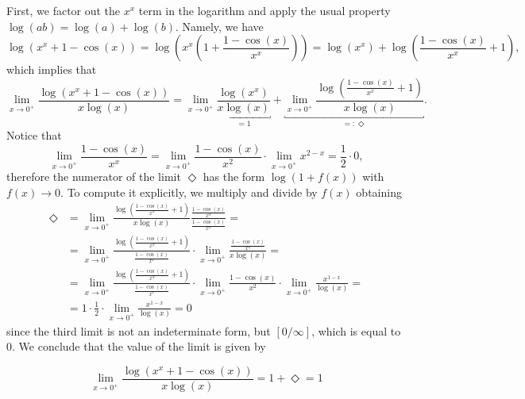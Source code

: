 \documentclass[a4paper,10 pt]{report}
\newcommand{\finalanswer}[1]{%
    \begin{finalAnswer}
    \[
        #1
    \]
    \end{finalAnswer}
}
\theoremstyle{definition}
\begin{document}
\begin{solutionBox}
First, we factor out the $x^x$ term in the logarithm and apply the usual property $\log(ab) = \log(a) + \log(b)$. Namely, we have
\begin{equation*}\log(x^x + 1 - \cos(x)) =  \log\left( x^x(1 + \frac{1 - \cos(x)}{x^x}) \right) = \log(x^x) + \log \left( \frac{1 - \cos(x)}{x^x} + 1 \right),\end{equation*}
which implies that
\begin{equation*}\lim_{x \to 0^+} \frac{\log(x^x + 1 - \cos(x))}{x \log(x)} = \lim_{x \to 0^+} \underbracket{\frac{\log(x^x)}{x \log(x)}}_{= 1} + \underbracket{\lim_{x \to 0^+} \frac{\log \left( \frac{1 - \cos(x)}{x^x} + 1 \right)}{x \log(x)}}_{=: \Diamond}. \end{equation*}
Notice that
\begin{equation*} \lim_{x \to 0^+} \frac{1 - \cos(x)}{x^x} = \lim_{x \to 0^+} \frac{1-\cos(x)}{x^2} \cdot \lim_{x \to 0^+} x^{2-x} = \frac{1}{2} \cdot 0,\end{equation*}
therefore the numerator of the limit $\Diamond$ has the form $\log(1 + f(x))$ with $f(x) \to 0$. To compute it explicitly, we multiply and divide by $f(x)$ obtaining
\begin{equation*}\begin{aligned} \Diamond & = \lim_{x \to 0^+} \frac{\log \left( \frac{1 - \cos(x)}{x^x} + 1 \right)}{x \log(x)} \frac{ \frac{1 - \cos(x)}{x^x} }{\frac{1 - \cos(x)}{x^x}} =
\\[1em] & = \lim_{x \to 0^+} \frac{\log \left( \frac{1 - \cos(x)}{x^x} + 1 \right)}{\frac{1 - \cos(x)}{x^x}} \cdot \lim_{x \to 0^+} \frac{ \frac{1 - \cos(x)}{x^x} }{x \log(x)} =
\\[1em] & = \lim_{x \to 0^+} \frac{\log \left( \frac{1 - \cos(x)}{x^x} + 1 \right)}{\frac{1 - \cos(x)}{x^x}} \cdot \lim_{x \to 0^+}  \frac{1 - \cos(x)}{x^2} \cdot \lim_{x \to 0^+} \frac{x^{1-x}}{ \log(x)} =
\\[1em] & = 1 \cdot \frac{1}{2} \cdot \lim_{x \to 0^+} \frac{x^{1-x}}{\log(x)} = 0 \end{aligned} \end{equation*}
since the third limit is not an indeterminate form, but $[0/\infty]$, which is equal to $0$. We conclude that the value of the limit is given by
\finalanswer{\lim_{x \to 0^+} \frac{\log(x^x + 1 - \cos(x))}{x \log(x)} = 1 + \Diamond = 1}
\end{solutionBox}




\end{document}
